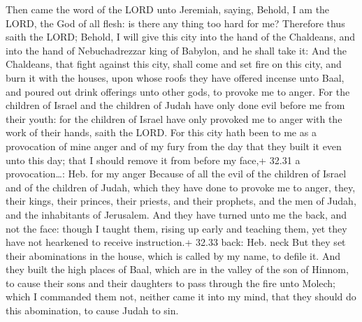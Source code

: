  Then came the word of the LORD unto Jeremiah, saying,
 Behold, I am the LORD, the God of all flesh: is there any
thing too hard for me?  Therefore thus saith the LORD;
Behold, I will give this city into the hand of the Chaldeans, and into
the hand of Nebuchadrezzar king of Babylon, and he shall take it:
 And the Chaldeans, that fight against this city, shall
come and set fire on this city, and burn it with the houses, upon whose
roofs they have offered incense unto Baal, and poured out drink
offerings unto other gods, to provoke me to anger.  For the
children of Israel and the children of Judah have only done evil before
me from their youth: for the children of Israel have only provoked me to
anger with the work of their hands, saith the LORD.  For
this city hath been to me as a provocation of mine anger and of my fury
from the day that they built it even unto this day; that I should remove
it from before my face,+ 32.31 a provocation\ldots: Heb. for my anger
 Because of all the evil of the children of Israel and of
the children of Judah, which they have done to provoke me to anger,
they, their kings, their princes, their priests, and their prophets, and
the men of Judah, and the inhabitants of Jerusalem.  And
they have turned unto me the back, and not the face: though I taught
them, rising up early and teaching them, yet they have not hearkened to
receive instruction.+ 32.33 back: Heb. neck  But they set
their abominations in the house, which is called by my name, to defile
it.  And they built the high places of Baal, which are in
the valley of the son of Hinnom, to cause their sons and their daughters
to pass through the fire unto Molech; which I commanded them not,
neither came it into my mind, that they should do this abomination, to
cause Judah to sin.

